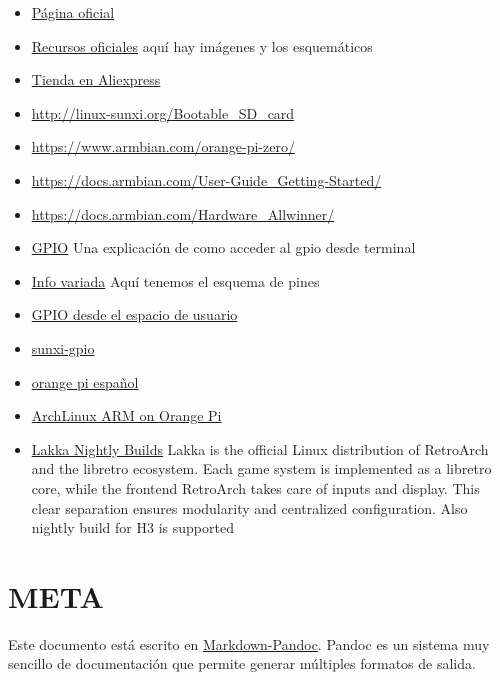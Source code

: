 \documentclass[12pt,spanish,]{scrartcl}
\providecommand{\tightlist}{%
  \setlength{\itemsep}{0pt}\setlength{\parskip}{0pt}}
\begin{document}
\begin{itemize}
\tightlist
\item
  \href{http://www.orangepi.org/}{Página oficial}
\item
  \href{http://www.orangepi.org/downloadresources/}{Recursos oficiales}
  aquí hay imágenes y los esquemáticos
\item
  \href{https://www.aliexpress.com/store/1553371?spm=2114.8147860.0.0.F1q43C}{Tienda
  en Aliexpress}
\item
  \url{http://linux-sunxi.org/Bootable_SD_card}
\item
  \url{https://www.armbian.com/orange-pi-zero/}
\item
  \url{https://docs.armbian.com/User-Guide_Getting-Started/}
\item
  \url{https://docs.armbian.com/Hardware_Allwinner/}
\item
  \href{https://linux-sunxi.org/GPIO}{GPIO} Una explicación de como
  acceder al gpio desde terminal
\item
  \href{https://linux-sunxi.org/Orange_Pi_Zero}{Info variada} Aquí
  tenemos el esquema de pines
\item
  \href{https://forum.armbian.com/index.php/topic/1886-gpio-access-from-user-space/}{GPIO
  desde el espacio de usuario}
\item
  \href{https://forum.armbian.com/index.php/topic/1471-solved-difficulty-accessing-gpio-via-the-sunxi-gpio-export-interface/}{sunxi-gpio}
\item
  \href{http://orangepiweb.es/index.php}{orange pi español}
\item
  \href{https://www.amedeobaragiola.me/blog/2016/06/04/archlinux-arm-on-orange-pi-one/}{ArchLinux
  ARM on Orange Pi}
\item
  \href{http://mirror.lakka.tv/nightly/}{Lakka Nightly Builds} Lakka is
  the official Linux distribution of RetroArch and the libretro
  ecosystem. Each game system is implemented as a libretro core, while
  the frontend RetroArch takes care of inputs and display. This clear
  separation ensures modularity and centralized configuration. Also
  nightly build for H3 is supported
\end{itemize}

\section{META}\label{meta}

Este documento está escrito en
\href{http://pandoc.org/README.html}{Markdown-Pandoc}. Pandoc es un
sistema muy sencillo de documentación que permite generar múltiples
formatos de salida.
\end{document}
